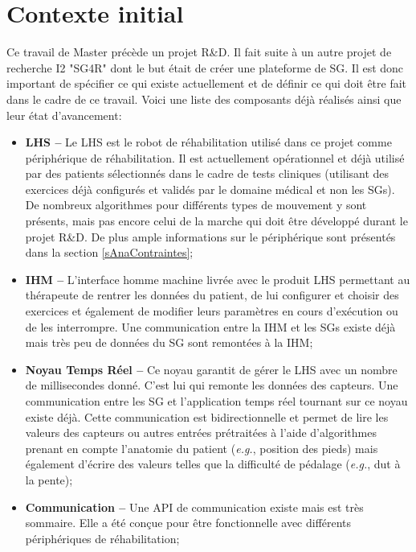 \section{Contexte initial}
	\label{sAnaEtatDesLieux}
	Ce travail de Master précède un projet R\&D. Il fait suite à un autre projet de recherche I2 "SG4R" dont le but était de créer une plateforme de SG. Il est donc important de spécifier ce qui existe actuellement et de définir ce qui doit être fait dans le cadre de ce travail. Voici une liste des composants déjà réalisés ainsi que leur état d'avancement:
	\begin{itemize}
		\item \textbf{LHS --} Le LHS \cite{LHS_website} est le robot de réhabilitation utilisé dans ce projet comme périphérique de réhabilitation. Il est actuellement opérationnel et déjà utilisé par des patients sélectionnés dans le cadre de tests cliniques (utilisant des exercices déjà configurés et validés par le domaine médical et non les SGs). De nombreux algorithmes pour différents types de mouvement y sont présents, mais pas encore celui de la marche qui doit être développé durant le projet R\&D. De plus ample informations sur le périphérique sont présentés dans la section \ref{sAnaContraintes};
		
		\item \textbf{IHM --} L'interface homme machine livrée avec le produit LHS permettant au thérapeute de rentrer les données du patient, de lui configurer et choisir des exercices et également de modifier leurs paramètres en cours d'exécution ou de les interrompre. Une communication entre la IHM et les SGs existe déjà mais très peu de données du SG sont remontées à la IHM;
		
		\item \textbf{Noyau Temps Réel --} Ce noyau garantit de gérer le LHS avec un nombre de millisecondes donné. C'est lui qui remonte les données des capteurs. Une communication entre les SG et l'application temps réel tournant sur ce noyau existe déjà. Cette communication est bidirectionnelle et permet de lire les valeurs des capteurs ou autres entrées prétraitées à l'aide d'algorithmes prenant en compte l'anatomie du patient (\textit{e.g.}, position des pieds) mais également d'écrire des valeurs telles que la difficulté de pédalage (\textit{e.g.}, dut à la pente);
		
		\item \textbf{Communication --} Une API de communication existe mais est très sommaire. Elle a été conçue pour être fonctionnelle avec différents périphériques de réhabilitation;
		

\end{itemize}
